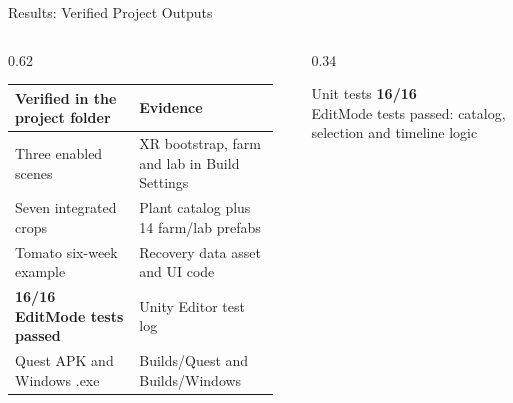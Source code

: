 \documentclass[aspectratio=169,11pt]{beamer}
\begin{document}
\begin{frame}{Results: Verified Project Outputs}
  \begin{columns}[T]
    \begin{column}{0.62\textwidth}
      \small
      \begin{tabular}{@{}p{0.44\linewidth}p{0.5\linewidth}@{}}
        \toprule
        \textbf{Verified in the project folder} & \textbf{Evidence} \\
        \midrule
        Three enabled scenes & XR bootstrap, farm and lab in Build Settings \\
        Seven integrated crops & Plant catalog plus 14 farm/lab prefabs \\
        Tomato six-week example & Recovery data asset and UI code \\
        \textbf{16/16 EditMode tests passed} & Unity Editor test log \\
        Quest APK and Windows .exe & Builds/Quest and Builds/Windows \\
        \bottomrule
      \end{tabular}
    \end{column}
    \begin{column}{0.34\textwidth}
      \begin{exampleblock}{Unit tests}
        {\Huge\textbf{16/16}}\\[3pt]
        {\small EditMode tests passed: catalog, selection and timeline logic}
      \end{exampleblock}
    \end{column}
  \end{columns}
\end{frame}
\end{document}
